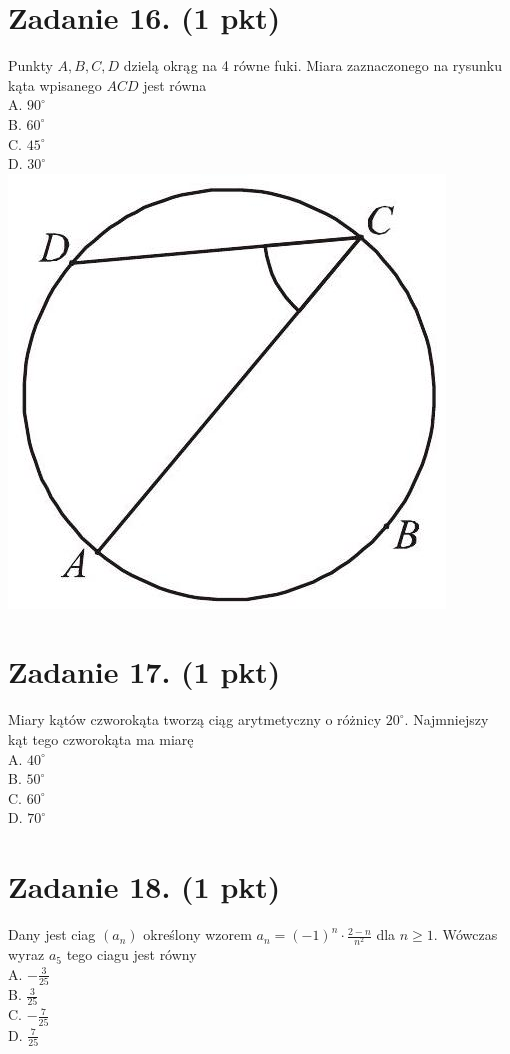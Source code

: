 \documentclass[10pt]{article}
\begin{document}
\section*{Zadanie 16. (1 pkt)}
Punkty \(A, B, C, D\) dzielą okrąg na 4 równe fuki. Miara zaznaczonego na rysunku kąta wpisanego \(A C D\) jest równa\\
A. \(90^{\circ}\)\\
B. \(60^{\circ}\)\\
C. \(45^{\circ}\)\\
D. \(30^{\circ}\)\\
\includegraphics[max width=\textwidth, center]{2024_11_21_dcf819de2d2eef051a0dg-06}

\section*{Zadanie 17. (1 pkt)}
Miary kątów czworokąta tworzą ciąg arytmetyczny o różnicy \(20^{\circ}\). Najmniejszy kąt tego czworokąta ma miarę\\
A. \(40^{\circ}\)\\
B. \(50^{\circ}\)\\
C. \(60^{\circ}\)\\
D. \(70^{\circ}\)

\section*{Zadanie 18. (1 pkt)}
Dany jest ciag \(\left(a_{n}\right)\) określony wzorem \(a_{n}=(-1)^{n} \cdot \frac{2-n}{n^{2}}\) dla \(n \geq 1\). Wówczas wyraz \(a_{5}\) tego ciagu jest równy\\
A. \(-\frac{3}{25}\)\\
B. \(\frac{3}{25}\)\\
C. \(-\frac{7}{25}\)\\
D. \(\frac{7}{25}\)
\end{document}
